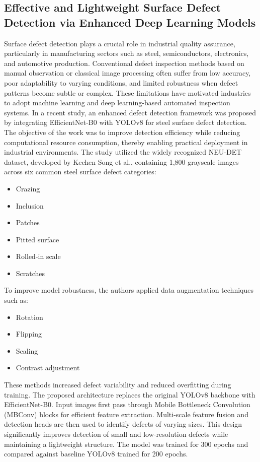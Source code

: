 \subsection{Effective and Lightweight Surface Defect Detection via Enhanced Deep Learning Models}
Surface defect detection plays a crucial role in industrial quality assurance, particularly in manufacturing sectors such as steel, semiconductors, electronics, and automotive production. Conventional defect inspection methods based on manual observation or classical image processing often suffer from low accuracy, poor adaptability to varying conditions, and limited robustness when defect patterns become subtle or complex. These limitations have motivated industries to adopt machine learning and deep learning-based automated inspection systems.
In a recent study, an enhanced defect detection framework was proposed by integrating EfficientNet-B0 with YOLOv8 for steel surface defect detection. The objective of the work was to improve detection efficiency while reducing computational resource consumption, thereby enabling practical deployment in industrial environments.
The study utilized the widely recognized NEU-DET dataset, developed by Kechen Song et al., containing 1,800 grayscale images across six common steel surface defect categories:
\begin{itemize}
\item Crazing
\item Inclusion
\item Patches
\item Pitted surface
\item Rolled-in scale
\item Scratches
\end{itemize}

To improve model robustness, the authors applied data augmentation techniques such as:
\begin{itemize}
\item Rotation
\item Flipping
\item Scaling
 \item Contrast adjustment
\end{itemize}

These methods increased defect variability and reduced overfitting during training.
The proposed architecture replaces the original YOLOv8 backbone with EfficientNet-B0. Input images first pass through Mobile Bottleneck Convolution (MBConv) blocks for efficient feature extraction. Multi-scale feature fusion and detection heads are then used to identify defects of varying sizes. This design significantly improves detection of small and low-resolution defects while maintaining a lightweight structure.
The model was trained for 300 epochs and compared against baseline YOLOv8 trained for 200 epochs.

